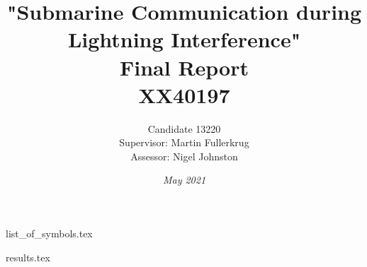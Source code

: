 \documentclass[11pt, oneside, a4paper]{report}
\begin{document}
\begin{titlepage}
    \title{"Submarine Communication during Lightning Interference"\\ Final Report \\ XX40197}
    \author{Candidate 13220 \\[0.5cm] Supervisor: Martin Fullerkrug \\[0.5cm] Assessor: Nigel Johnston}
    \date{\textit{May 2021}}
\end{titlepage}


\maketitle

\setcounter{page}{0}
\tableofcontents
\thispagestyle{empty}
\newpage
{}
\renewcommand{\thesection}{\Roman{section}}
\listofigures
\pagebreak
{}
\listoftables
\pagebreak
{list_of_symbols.tex}
\newpage
\setcounter{section}{0}

\setcounter{page}{1}
\renewcommand{\thesection}{\arabic{chapter}.\arabic{section}}
{results.tex}
\renewcommand{\bibname}{References}


\end{document}
